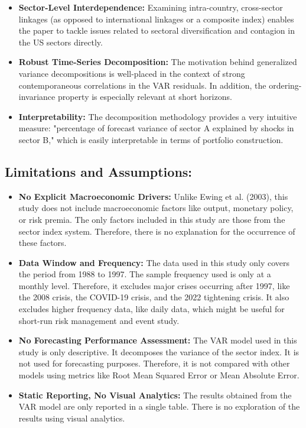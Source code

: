 \documentclass{article}
\begin{document}
\begin{itemize}
    \item \textbf{Sector-Level Interdependence:}  
    Examining intra-country, cross-sector linkages (as opposed to international linkages or a composite index) enables the paper to tackle issues related to sectoral diversification and contagion in the US sectors directly.
    
    \item \textbf{Robust Time-Series Decomposition:}  
    The motivation behind generalized variance decompositions is well-placed in the context of strong contemporaneous correlations in the VAR residuals. In addition, the ordering-invariance property is especially relevant at short horizons. 
    
    \item \textbf{Interpretability:}  
    The decomposition methodology provides a very intuitive measure: "percentage of forecast variance of sector A explained by shocks in sector B," which is easily interpretable in terms of portfolio construction.
\end{itemize}

\hfill

\subsection{Limitations and Assumptions:}

\begin{itemize}
    \item \textbf{No Explicit Macroeconomic Drivers:}  
    Unlike Ewing et al. (2003), this study does not include macroeconomic factors like output, monetary policy, or risk premia. The only factors included in this study are those from the sector index system. Therefore, there is no explanation for the occurrence of these factors.
    
    \item \textbf{Data Window and Frequency:}  
    The data used in this study only covers the period from 1988 to 1997. The sample frequency used is only at a monthly level. Therefore, it excludes major crises occurring after 1997, like the 2008 crisis, the COVID-19 crisis, and the 2022 tightening crisis. It also excludes higher frequency data, like daily data, which might be useful for short-run risk management and event study.
    
    \item \textbf{No Forecasting Performance Assessment:}  
    The VAR model used in this study is only descriptive. It decomposes the variance of the sector index. It is not used for forecasting purposes. Therefore, it is not compared with other models using metrics like Root Mean Squared Error or Mean Absolute Error.
    
    \item \textbf{Static Reporting, No Visual Analytics:}  
    The results obtained from the VAR model are only reported in a single table. There is no exploration of the results using visual analytics.
\end{itemize}
\end{document}
